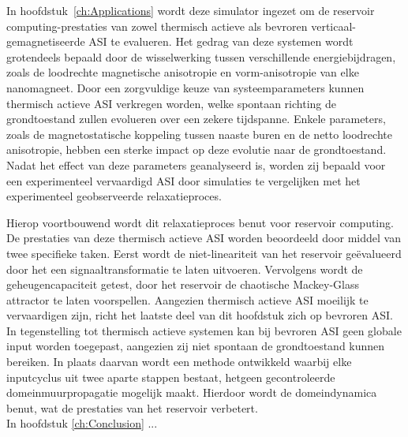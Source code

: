 In hoofdstuk~\ref{ch:Applications} wordt deze \hotspice simulator ingezet om de reservoir computing-prestaties van zowel thermisch actieve als bevroren verticaal-gemagnetiseerde ASI te evalueren.
Het gedrag van deze systemen wordt grotendeels bepaald door de wisselwerking tussen verschillende energiebijdragen, zoals de loodrechte magnetische anisotropie en vorm-anisotropie van elke nanomagneet.
Door een zorgvuldige keuze van systeemparameters kunnen thermisch actieve ASI verkregen worden, welke spontaan richting de grondtoestand zullen evolueren over een zekere tijdspanne.
Enkele parameters, zoals de magnetostatische koppeling tussen naaste buren en de netto loodrechte anisotropie, hebben een sterke impact op deze evolutie naar de grondtoestand.
Nadat het effect van deze parameters geanalyseerd is, worden zij bepaald voor een experimenteel vervaardigd ASI door simulaties te vergelijken met het experimenteel geobserveerde relaxatieproces. \par
Hierop voortbouwend wordt dit relaxatieproces benut voor reservoir computing.
De prestaties van deze thermisch actieve ASI worden beoordeeld door middel van twee specifieke taken.
Eerst wordt de niet-lineariteit van het reservoir ge\"evalueerd door het een signaaltransformatie te laten uitvoeren.
Vervolgens wordt de geheugencapaciteit getest, door het reservoir de chaotische Mackey-Glass attractor te laten voorspellen.
Aangezien thermisch actieve ASI moeilijk te vervaardigen zijn, richt het laatste deel van dit hoofdstuk zich op bevroren ASI.
In tegenstelling tot thermisch actieve systemen kan bij bevroren ASI geen globale input worden toegepast, aangezien zij niet spontaan de grondtoestand kunnen bereiken.
In plaats daarvan wordt een methode ontwikkeld waarbij elke inputcyclus uit twee aparte stappen bestaat, hetgeen gecontroleerde domeinmuurpropagatie mogelijk maakt.
Hierdoor wordt de domeindynamica benut, wat de prestaties van het reservoir verbetert. \\

In hoofdstuk \ref{ch:Conclusion} ...
